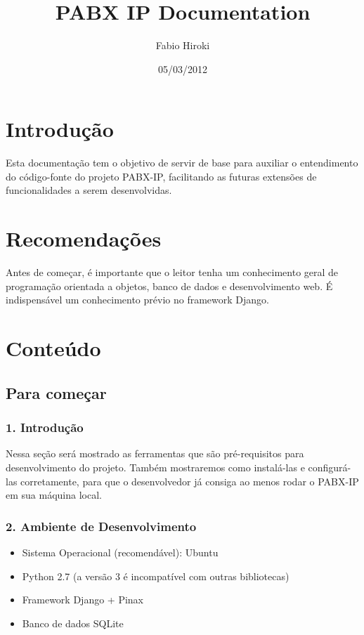 \documentclass[letterpaper,10pt,brazil]{sphinxmanual}
\title{PABX IP Documentation}
\date{05/03/2012}
\author{Fabio Hiroki}
\begin{document}
\maketitle
\tableofcontents
{}\label{index::doc}



\chapter{Introdução}
\label{index:bem-vindo-a-documentacao-do-projeto-pabx-ip}\label{index:introducao}
Esta documentação tem o objetivo de servir de base para auxiliar o entendimento do código-fonte do projeto PABX-IP, facilitando as futuras extensões de funcionalidades a serem desenvolvidas.


\chapter{Recomendações}
\label{index:recomendacoes}
Antes de começar, é importante que o leitor tenha um conhecimento geral de programação orientada a objetos, banco de dados e desenvolvimento web. É indispensável um conhecimento prévio no framework Django.


\chapter{Conteúdo}
\label{index:conteudo}

\section{Para começar}
\label{inicio::doc}\label{inicio:para-comecar}

\subsection{1. Introdução}
\label{inicio:introducao}
Nessa seção será mostrado as ferramentas que são pré-requisitos para desenvolvimento do projeto. Também mostraremos como instalá-las e configurá-las corretamente, para que o desenvolvedor já consiga ao menos rodar o PABX-IP em sua máquina local.


\subsection{2. Ambiente de Desenvolvimento}
\label{inicio:ambiente-de-desenvolvimento}\begin{itemize}
\item {} 
Sistema Operacional (recomendável): Ubuntu

\item {} 
Python 2.7 (a versão 3 é incompatível com outras bibliotecas)

\item {} 
Framework Django + Pinax

\item {} 
Banco de dados SQLite

\end{itemize}
\end{document}
